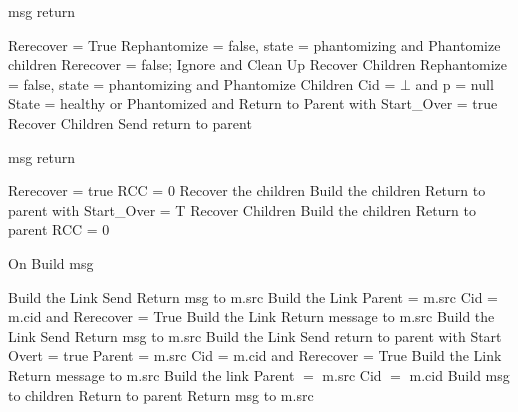 \documentclass{article}
\begin{document}
\begin{algorithm}
\caption{msg return}
\label{ Done message received}
\begin{algorithmic}[1]
				\State Rerecover = True
			\EndIf
				\State Rephantomize = false, state = phantomizing and Phantomize children
				\State Rerecover = false;
					\State Ignore and Clean Up
				\Else
					\State Recover Children
				\EndIf
			\EndIf
		\Else
				\State Rephantomize = false, state = phantomizing and Phantomize Children
				\State Cid = $\bot$ and p = null
				\State State = healthy or Phantomized and  Return to Parent with Start\_Over = true
				\State Recover Children
			\Else
				\State Send return to parent
			\EndIf
		\EndIf
{}
\end{algorithmic}
\end{algorithm}

\begin{algorithm}
\caption{msg return}
\label{ build or recoveryDone message received}
\begin{algorithmic}[1]
				\State Rerecover = true
			\EndIf
					\State RCC = 0
					\State Recover the children
				\Else
					\State Build the children
				\EndIf
			\EndIf
		\Else
				\State Return to parent with Start\_Over = T
					\State Recover Children
				\Else
					\State Build the children
				\EndIf
			\Else
				\State Return to parent
				\State RCC = 0
			\EndIf
		\EndIf
	\EndIf
\EndIf
\EndProcedure
\end{algorithmic}
\end{algorithm}	


	
\begin{algorithm}
\caption{On Build msg}
\label{Build message received}
\begin{algorithmic}[1]
			\State Build the Link
			\State Send Return msg to m.src
			\State Build the Link
			\State Parent = m.src
			\State Cid = m.cid and Rerecover = True
		\Else
			\State Build the Link
			\State Return message to m.src
		\EndIf
	\Else
			\State Build the Link
			\State Send Return msg to m.src
			\State Build the Link
			\State Send return to parent with Start Overt = true
			\State Parent = m.src
			\State Cid = m.cid and Rerecover = True
		\Else
			\State Build the Link
			\State Return message to m.src
		\EndIf
	\EndIf
{}
	\State Build the link
	\State Parent $=$ m.src
	\State Cid $=$ m.cid
		\State Build msg to children
	\Else
		\State Return to parent
	\EndIf
{}
	\State Return msg to m.src
\end{algorithmic}
\end{algorithm}	
\end{document}
